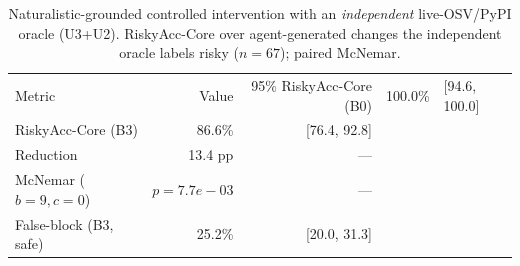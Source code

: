\begin{table}[t]\centering
\caption{Naturalistic-grounded controlled intervention with an \emph{independent} live-OSV/PyPI oracle (U3+U2). RiskyAcc-Core over agent-generated changes the independent oracle labels risky ($n=67$); paired McNemar.}
\label{tab:e1a-indep}
\begin{tabular}{lrr}
\toprule
Metric & Value & 95\%%
\midrule
RiskyAcc-Core (B0) & 100.0\% & [94.6, 100.0] \\
RiskyAcc-Core (B3) & 86.6\% & [76.4, 92.8] \\
Reduction & 13.4 pp & --- \\
McNemar ($b{=}9,c{=}0$) & $p{=}7.7e-03$ & --- \\
False-block (B3, safe) & 25.2\% & [20.0, 31.3] \\
\bottomrule
\end{tabular}
\end{table}
